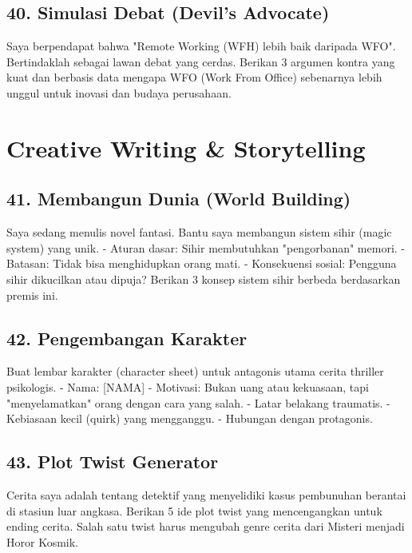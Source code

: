 \subsection{40. Simulasi Debat (Devil's Advocate)}
\begin{promptbox}
Saya berpendapat bahwa "Remote Working (WFH) lebih baik daripada WFO".
Bertindaklah sebagai lawan debat yang cerdas. Berikan 3 argumen kontra yang kuat dan berbasis data mengapa WFO (Work From Office) sebenarnya lebih unggul untuk inovasi dan budaya perusahaan.
\end{promptbox}

\section{Creative Writing \& Storytelling}

\subsection{41. Membangun Dunia (World Building)}
\begin{promptbox}
Saya sedang menulis novel fantasi. Bantu saya membangun sistem sihir (magic system) yang unik.
- Aturan dasar: Sihir membutuhkan "pengorbanan" memori.
- Batasan: Tidak bisa menghidupkan orang mati.
- Konsekuensi sosial: Pengguna sihir dikucilkan atau dipuja?
Berikan 3 konsep sistem sihir berbeda berdasarkan premis ini.
\end{promptbox}

\subsection{42. Pengembangan Karakter}
\begin{promptbox}
Buat lembar karakter (character sheet) untuk antagonis utama cerita thriller psikologis.
- Nama: [NAMA]
- Motivasi: Bukan uang atau kekuasaan, tapi "menyelamatkan" orang dengan cara yang salah.
- Latar belakang traumatis.
- Kebiasaan kecil (quirk) yang mengganggu.
- Hubungan dengan protagonis.
\end{promptbox}

\subsection{43. Plot Twist Generator}
\begin{promptbox}
Cerita saya adalah tentang detektif yang menyelidiki kasus pembunuhan berantai di stasiun luar angkasa.
Berikan 5 ide plot twist yang mencengangkan untuk ending cerita.
Salah satu twist harus mengubah genre cerita dari Misteri menjadi Horor Kosmik.
\end{promptbox}

